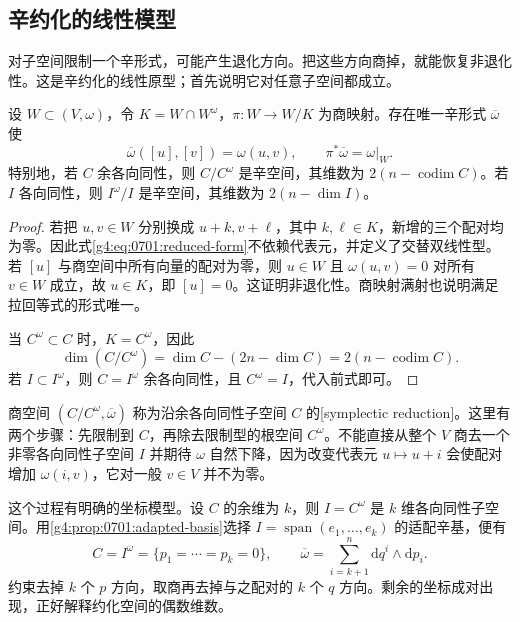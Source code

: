 \subsection{辛约化的线性模型}
\label{g4:subsec:0701:03}

对子空间限制一个辛形式，可能产生退化方向。把这些方向商掉，就能恢复非退化性。这是辛约化的线性原型；首先说明它对任意子空间都成立。

\begin{theorem}\label{g4:thm:0701:linear-reduction}
	设 \(W\subset(V,\omega)\)，令 \(K=W\cap W^\omega\)，\(\pi:W\to W/K\) 为商映射。存在唯一辛形式 \(\overline\omega\) 使
	\begin{equation}\label{g4:eq:0701:reduced-form}
		\overline\omega([u],[v])=\omega(u,v),
		\qquad \pi^*\overline\omega=\omega|_W.
	\end{equation}
	特别地，若 \(C\) 余各向同性，则 \(C/C^\omega\) 是辛空间，其维数为 \(2(n-\operatorname{codim}C)\)。若 \(I\) 各向同性，则 \(I^\omega/I\) 是辛空间，其维数为 \(2(n-\dim I)\)。
\end{theorem}
\begin{proof}
	若把 \(u,v\in W\) 分别换成 \(u+k,v+\ell\)，其中 \(k,\ell\in K\)，新增的三个配对均为零。因此式\eqref{g4:eq:0701:reduced-form}不依赖代表元，并定义了交替双线性型。若 \([u]\) 与商空间中所有向量的配对为零，则 \(u\in W\) 且 \(\omega(u,v)=0\) 对所有 \(v\in W\) 成立，故 \(u\in K\)，即 \([u]=0\)。这证明非退化性。商映射满射也说明满足拉回等式的形式唯一。

	当 \(C^\omega\subset C\) 时，\(K=C^\omega\)，因此
	\[
		\dim(C/C^\omega)=\dim C-(2n-\dim C)
		=2(n-\operatorname{codim}C).
	\]
	若 \(I\subset I^\omega\)，则 \(C=I^\omega\) 余各向同性，且 \(C^\omega=I\)，代入前式即可。
\end{proof}

商空间 \((C/C^\omega,\overline\omega)\) 称为沿余各向同性子空间 \(C\) 的[symplectic reduction]。这里有两个步骤：先限制到 \(C\)，再除去限制型的根空间 \(C^\omega\)。不能直接从整个 \(V\) 商去一个非零各向同性子空间 \(I\) 并期待 \(\omega\) 自然下降，因为改变代表元 \(u\mapsto u+i\) 会使配对增加 \(\omega(i,v)\)，它对一般 \(v\in V\) 并不为零。

\ProseParagraphBreak

这个过程有明确的坐标模型。设 \(C\) 的余维为 \(k\)，则 \(I=C^\omega\) 是 \(k\) 维各向同性子空间。用\cref{g4:prop:0701:adapted-basis}选择 \(I=\operatorname{span}(e_1,\ldots,e_k)\) 的适配辛基，便有
\begin{equation}\label{g4:eq:0701:reduction-coordinates}
	C=I^\omega=\{p_1=\cdots=p_k=0\},
	\qquad
	\overline\omega=\sum_{i=k+1}^n\mathrm{d}q^i\wedge\mathrm{d}p_i.
\end{equation}
约束去掉 \(k\) 个 \(p\) 方向，取商再去掉与之配对的 \(k\) 个 \(q\) 方向。剩余的坐标成对出现，正好解释约化空间的偶数维数。

